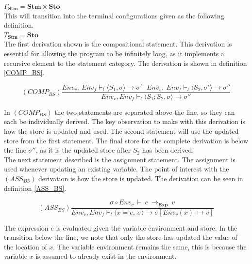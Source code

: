$\Gamma _{\mathbf{Stm}} = \mathbf{Stm} \times \mathbf{Sto}$ \\

\noindent This will transition into the terminal configurations given as the following definition. \\

$T_{\mathbf{Stm}} = \mathbf{Sto}$ \\

\noindent The first derivation shown is the compositional statement. This derivation is essential for allowing the program to be infinitely long, as it implements a recursive element to the statement category. The derivation is shown in definition \ref{COMP_BS}.

\begin{equation} \label{COMP_BS}
    (COMP_{BS})\frac{Env_v,\ Env_f \vdash _l \langle S_1, \sigma \rangle \rightarrow  \sigma ' \ \ \ Env_v,\ Env_f \vdash _l \langle S_2, \sigma' \rangle \rightarrow \sigma ''}{Env_v, Env_f \vdash _l \langle S_1;S_2, \sigma \rangle \rightarrow  \sigma ''}
\end{equation}

\noindent In $(COMP_{BS})$ the two statements are separated above the line, so they can each be individually derived. The key observation to make with this derivation is how the store is updated and used. The second statement will use the updated store from the first statement. The final store for the complete derivation is below the line $\sigma''$, as it is the updated store after $S_2$ has been derived. \\ 

The next statement described is the assignment statement. The assignment is used whenever updating an existing variable. The point of interest with the $(ASS_{BS})$ derivation is how the store is updated. The derivation can be seen in definition \ref{ASS_BS}. 

\begin{equation} \label{ASS_BS}
    (ASS_{BS})\frac{\sigma \circ Env_v \ \vdash\ e\ \rightarrow _{\mathbf{Exp}} \ v}{Env_v, Env_f \vdash _l \langle x = e,\ \sigma \rangle \rightarrow \sigma[Env_v(x)\ \mapsto v]}
\end{equation}

\noindent The expression $e$ is evaluated given the variable environment and store. In the transition below the line, we note that only the store has updated the value of the location of $x$. The variable environment remains the same, this is because the variable $x$ is assumed to already exist in the environment. \\

